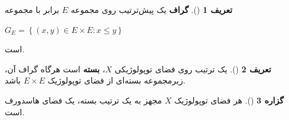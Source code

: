 \documentclass[12pt,a4paper]{article}
\theoremstyle{definition}
\newtheorem{definition}{تعریف}[section]
\theoremstyle{theorem}
\newtheorem{proposition}[definition]{گزاره}
\theoremstyle{definition}
\begin{document}
\begin{definition}[\cite{Nachbin}]

\textbf{گراف}
 یک پیش‌ترتیب روی مجموعه 
$ E $
برابر با مجموعه 
\begin{flushleft}
$ G_{E}=\left\lbrace (x,y)\in E  \times E : x\leq y\right\rbrace $
\end{flushleft}
است.
\end{definition}
\begin{definition}[\cite{Nachbin}]
یک ترتیب روی فضای توپولوژیکی 
$ X $، \textbf{بسته}
است هرگاه گراف آن، 
\linebreak
زیر‌مجموعه بسته‌ای از فضای توپولوژیک 
$ E \times E $
باشد.
\end{definition}
\begin{proposition}[\cite{Nachbin}]
هر فضای توپولوژیک 
$ X $
مجهز  به یک ترتیب بسته،   یک فضای هاسدورف است.
\end{proposition}
\end{document}
